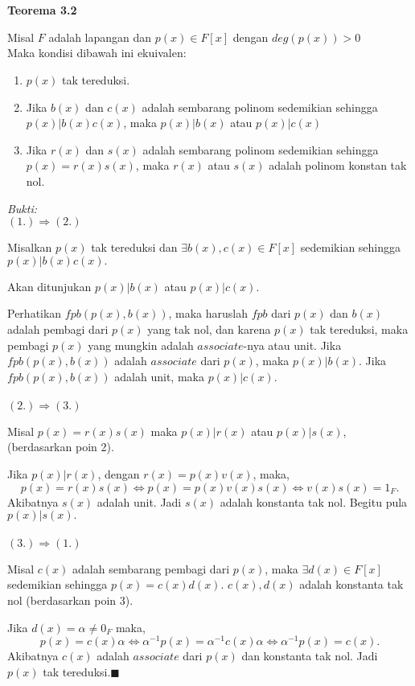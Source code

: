 \\
\\
\textbf{Teorema 3.2}
\par Misal $F$ adalah lapangan dan $p(x) \in F[x]$ dengan $deg(p(x))>0$
\\ Maka kondisi dibawah ini ekuivalen:
\begin{enumerate}
\item $p(x)$ tak tereduksi.
\item Jika $b(x)$ dan $c(x)$ adalah sembarang polinom sedemikian sehingga $p(x)|b(x)c(x)$, maka $p(x)|b(x)$ atau $p(x)|c(x)$
\item Jika $r(x)$ dan $s(x)$ adalah sembarang polinom sedemikian sehingga $p(x)=r(x)s(x)$, maka $r(x)$ atau $s(x)$ adalah polinom konstan tak nol.
\end{enumerate}
	\textit{Bukti:}
\\ $(1.)\Rightarrow(2.)$
\par 	Misalkan $p(x)$ tak tereduksi dan $\exists b(x),c(x) \in F[x]$ sedemikian sehingga $p(x)|b(x)c(x).$
\par 	Akan ditunjukan $p(x)|b(x)$ atau $p(x)|c(x).$ 
\par 	Perhatikan $fpb(p(x),b(x))$, maka haruslah $fpb$ dari $p(x)$ dan $b(x)$ adalah pembagi dari $p(x)$ yang tak nol, dan karena $p(x)$ tak tereduksi, maka pembagi $p(x)$ yang mungkin adalah $associate$-nya atau unit. Jika $fpb(p(x),b(x))$ adalah $associate$ dari $p(x)$, maka $p(x)|b(x)$. Jika $fpb(p(x),b(x))$ adalah unit, maka $p(x)|c(x).$
\\
\\ $(2.)\Rightarrow(3.)$
\par 	Misal $p(x)=r(x)s(x)$ maka $p(x)|r(x)$ atau $p(x)|s(x)$, (berdasarkan poin 2).
\par 	Jika $p(x)|r(x)$, dengan $r(x)=p(x)v(x)$, maka, 
	$$ p(x)=r(x)s(x) \iff  p(x)=p(x)v(x)s(x) \iff  v(x)s(x)=1_F.$$
	Akibatnya $s(x)$ adalah unit. Jadi $s(x)$ adalah konstanta tak nol. Begitu pula $p(x)|s(x).$
\\
\\ $(3.)\Rightarrow(1.)$
\par Misal $c(x)$ adalah sembarang pembagi dari $p(x)$, maka $\exists d(x) \in F[x]$ sedemikian sehingga $p(x)=c(x)d(x).$ $c(x),d(x)$ adalah konstanta tak nol (berdasarkan poin 3).
\par 	Jika $d(x)=\alpha \ne 0_F$ maka,
	$$ p(x)=c(x)\alpha \iff  \alpha ^{-1}p(x)=\alpha ^{-1}c(x)\alpha \iff  \alpha ^{-1}p(x)=c(x).$$
Akibatnya $c(x)$ adalah $associate$ dari $p(x)$ dan konstanta tak nol. Jadi $p(x)$ tak tereduksi.$\blacksquare$
